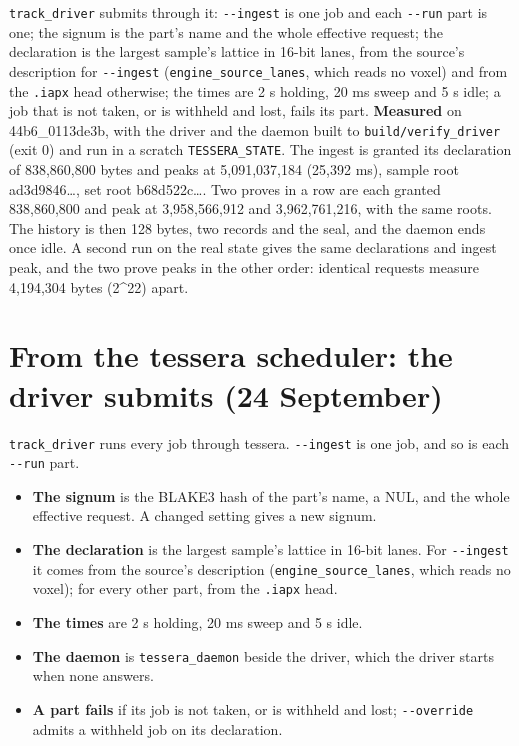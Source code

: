 \texttt{track\_\allowbreak{}driver} submits through it: \texttt{-\allowbreak{}-\allowbreak{}ingest} is one job and each \texttt{-\allowbreak{}-\allowbreak{}run} part is one; the signum is the part's name and the whole effective request; the declaration is the largest sample's lattice in 16-bit lanes, from the source's description for \texttt{-\allowbreak{}-\allowbreak{}ingest} (\texttt{engine\_\allowbreak{}source\_\allowbreak{}lanes}, which reads no voxel) and from the \texttt{.\allowbreak{}iapx} head otherwise; the times are 2 s holding, 20 ms sweep and 5 s idle; a job that is not taken, or is withheld and lost, fails its part. \textbf{Measured} on 44b6\_\allowbreak{}0113de3b, with the driver and the daemon built to \texttt{build/\allowbreak{}verify\_\allowbreak{}driver} (exit 0) and run in a scratch \texttt{TESSERA\_\allowbreak{}STATE}. The ingest is granted its declaration of 838,860,800 bytes and peaks at 5,091,037,184 (25,392 ms), sample root ad3d9846…, set root b68d522c…. Two proves in a row are each granted 838,860,800 and peak at 3,958,566,912 and 3,962,761,216, with the same roots. The history is then 128 bytes, two records and the seal, and the daemon ends once idle. A second run on the real state gives the same declarations and ingest peak, and the two prove peaks in the other order: identical requests measure 4,194,304 bytes (2\textasciicircum{}22) apart.

\section{\texorpdfstring{From the tessera scheduler: the driver submits (24 September)}{From the tessera scheduler: the driver submits (24 September)}}

\texttt{track\_\allowbreak{}driver} runs every job through tessera. \texttt{-\allowbreak{}-\allowbreak{}ingest} is one job, and so is each \texttt{-\allowbreak{}-\allowbreak{}run} part.

\begin{itemize}
\item \textbf{The signum} is the BLAKE3 hash of the part's name, a NUL, and the whole effective request. A changed setting gives a new signum.
\item \textbf{The declaration} is the largest sample's lattice in 16-bit lanes. For \texttt{-\allowbreak{}-\allowbreak{}ingest} it comes from the source's description (\texttt{engine\_\allowbreak{}source\_\allowbreak{}lanes}, which reads no voxel); for every other part, from the \texttt{.\allowbreak{}iapx} head.
\item \textbf{The times} are 2 s holding, 20 ms sweep and 5 s idle.
\item \textbf{The daemon} is \texttt{tessera\_\allowbreak{}daemon} beside the driver, which the driver starts when none answers.
\item \textbf{A part fails} if its job is not taken, or is withheld and lost; \texttt{-\allowbreak{}-\allowbreak{}override} admits a withheld job on its declaration.
\end{itemize}

